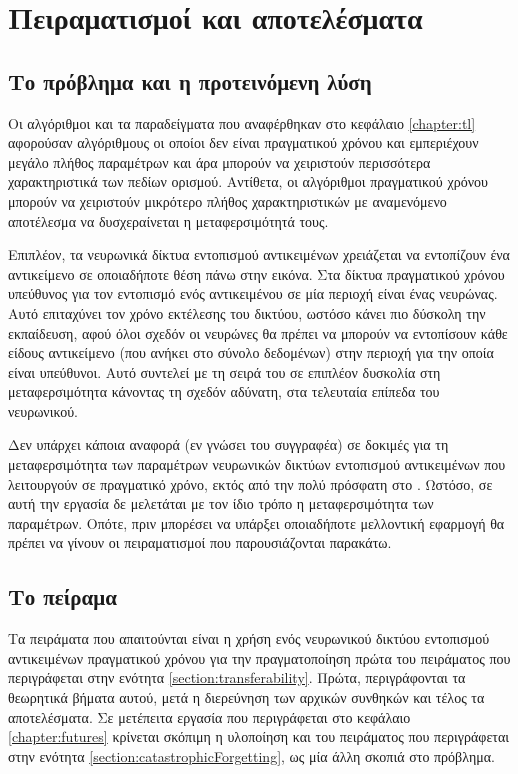\chapter{Πειραματισμοί και αποτελέσματα}
\label{chapter:experiments}
\section{Το πρόβλημα και η προτεινόμενη λύση}
Οι αλγόριθμοι και τα παραδείγματα που αναφέρθηκαν στο κεφάλαιο \ref{chapter:tl} αφορούσαν αλγόριθμους οι οποίοι δεν είναι πραγματικού χρόνου και εμπεριέχουν μεγάλο πλήθος παραμέτρων και άρα μπορούν να χειριστούν περισσότερα χαρακτηριστικά των πεδίων ορισμού. Αντίθετα, οι αλγόριθμοι πραγματικού χρόνου μπορούν να χειριστούν μικρότερο πλήθος χαρακτηριστικών με αναμενόμενο αποτέλεσμα να δυσχεραίνεται η μεταφερσιμότητά τους.

Επιπλέον, τα νευρωνικά δίκτυα εντοπισμού αντικειμένων χρειάζεται να εντοπίζουν ένα αντικείμενο σε οποιαδήποτε θέση πάνω στην εικόνα. Στα δίκτυα πραγματικού χρόνου υπεύθυνος για τον εντοπισμό ενός αντικειμένου σε μία περιοχή είναι ένας νευρώνας. Αυτό επιταχύνει τον χρόνο εκτέλεσης του δικτύου, ωστόσο κάνει πιο δύσκολη την εκπαίδευση, αφού όλοι σχεδόν οι νευρώνες θα πρέπει να μπορούν να εντοπίσουν κάθε είδους αντικείμενο (που ανήκει στο σύνολο δεδομένων) στην περιοχή για την οποία είναι υπεύθυνοι. Αυτό συντελεί με τη σειρά του σε επιπλέον δυσκολία στη μεταφερσιμότητα κάνοντας τη σχεδόν αδύνατη, στα τελευταία επίπεδα του νευρωνικού.

Δεν υπάρχει κάποια αναφορά (εν γνώσει του συγγραφέα) σε δοκιμές για τη μεταφερσιμότητα των παραμέτρων νευρωνικών δικτύων εντοπισμού αντικειμένων που λειτουργούν σε πραγματικό χρόνο, εκτός από την πολύ πρόσφατη στο \cite{82}. Ωστόσο, σε αυτή την εργασία δε μελετάται με τον ίδιο τρόπο η μεταφερσιμότητα των παραμέτρων. Οπότε, πριν μπορέσει να υπάρξει οποιαδήποτε μελλοντική εφαρμογή θα πρέπει να γίνουν οι πειραματισμοί που παρουσιάζονται παρακάτω.

\section{Το πείραμα}
\label{section:TheExperiment}
Τα πειράματα που απαιτούνται είναι η χρήση ενός νευρωνικού δικτύου εντοπισμού αντικειμένων πραγματικού χρόνου για την πραγματοποίηση πρώτα του πειράματος που περιγράφεται στην ενότητα \ref{section:transferability}. Πρώτα, περιγράφονται τα θεωρητικά βήματα αυτού, μετά η διερεύνηση των αρχικών συνθηκών και τέλος τα αποτελέσματα. Σε μετέπειτα εργασία που περιγράφεται στο κεφάλαιο \ref{chapter:futures} κρίνεται σκόπιμη η υλοποίηση και του πειράματος που περιγράφεται στην ενότητα \ref{section:catastrophicForgetting}, ως μία άλλη σκοπιά στο πρόβλημα.

